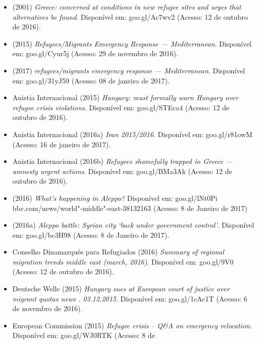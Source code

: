 
\begingroup

\small
\begin{itemize}
\item
   (2001) \emph{Greece:  concerned at conditions in new
  refugee sites and urges that alternatives be found}. Disponível em:
  goo.gl/Ac7wv2 (Acesso: 12 de outubro de 2016).
\item
   (2015) \emph{Refugees/Migrants Emergency Response ---
  Mediterranean}. Disponível em: goo.gl/Cyur5j (Acesso: 29 de novembro
  de 2016).
\item
   (2017) \emph{ refugees/migrants emergency response ---
  Mediterranean}. Disponível em: goo.gl/31yJ59 (Acesso: 08 de janeiro de
  2017).
\item
  Anistia Internacional (2015) \emph{Hungary:  must formally warn
  Hungary over refugee crisis violations}. Disponível em: goo.gl/{STE}ca4
  (Acesso: 12 de outubro de 2016).
\item
  Anistia Internacional (2016a) \emph{Iran 2015/2016}. Disponível em:
  goo.gl/r81owM (Acesso: 16 de janeiro de 2017).
\item
  Anistia Internacional (2016b) \emph{Refugees shamefully trapped in
  Greece ---} \emph{amnesty urgent actions}. Disponível em:
  goo.gl/{BM}a3Ak (Acesso: 12 de outubro de 2016).
\item
   (2016) \emph{What}\emph{'}\emph{s happening in Aleppo?} Disponível
  em: goo.gl/lNt0Pi
  bbc.com/news/world"-middle"-east-38132163 
  (Acesso: 8 de Janeiro de 2017)
\item
   (2016a) \emph{Aleppo battle: Syrian city} \emph{`}\emph{back under
  government control}\emph{'}. Disponível em: goo.gl/bc3H98 (Acesso: 8
  de Janeiro de 2017).
\item
  Conselho Dinamarquês para Refugiados (2016) \emph{Summary of regional
  migration trends middle east (march, 2016)}. Disponível em:
  goo.gl/9V0 (Acesso: 12 de outubro de 2016).
\item
  Deutsche Welle (2015) \emph{Hungary sues  at European court of
  justice over migrant quotas \textbar{} news \textbar{} .
  \textbar{} 03.12.2015}. Disponível em: goo.gl/1cAc1T (Acesso: 6 de
  novembro de 2016).
\item
  European Commission (2015) \emph{Refugee crisis} \emph{--} \emph{Q\&A
  on emergency relocation}. Disponível em: goo.gl/{WJ}0{RTK} (Acesso: 8 de

\end{itemize}
